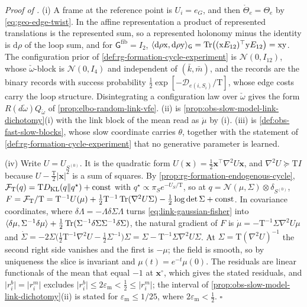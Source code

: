\noindent\emph{Proof of .}
(i) A frame at the reference point is $U_i=e_G$, and then $\mathring\Theta_e=\Theta_e$ by
\eqref{eq:geo-edge-twist}. In the affine representation a product of represented translations is the
represented sum, so a represented holonomy minus the identity is $\mathrm d\rho$ of the loop sum, and
for $\mathsf G^{\mathrm{fib}}=I_2$,
$\langle\mathrm d\rho\mathrm x,\mathrm d\rho\mathrm y\rangle_{\mathsf G}=\operatorname{Tr}\bigl((\mathrm xE_{12})^\top\mathrm yE_{12}\bigr)=\mathrm x\mathrm y$.
The configuration prior of \cref{def:rg-formation-cycle-experiment} is $\mathcal N(0,I_{12})$, whose
$\check\omega$-block is $\mathcal N(0,I_4)$ and independent of $(\bar k,\bar m)$, and the records are
the binary records with success probability $\tfrac12\exp[-\mathcal D_{e(i,S_i)}/\mathrm T]$, whose
edge costs carry the loop structure. Disintegrating a configuration law over $\check\omega$ gives the
form $R(d\check\omega)Q_{\check\omega}$ of \cref{prop:elbo-random-link-vfe}. (ii) is
\cref{prop:obs-slow-model-link-dichotomy}(i) with the link block of the mean read as
$\mathring\mu$ by (i). (iii) is \cref{def:obs-fast-slow-blocks}, whose slow coordinate carries
$\theta$, together with the statement of \cref{def:rg-formation-cycle-experiment} that no generative
parameter is learned.

(iv) Write $U=U_{S^{(0)}}$. It is the quadratic form
$U(\mathbf x)=\tfrac12\mathbf x^\top\nabla^2U\mathbf x$, and $\nabla^2U\succeq\mathrm TI$ because
$U-\tfrac{\mathrm T}2\lvert\mathbf x\rvert^2$ is a sum of squares. By
\cref{prop:rg-formation-endogenous-cycle}, $\mathcal F_{\mathrm T}(q)=\mathrm TD_{\mathrm{KL}}(q\Vert q^\star)+\mathrm{const}$
with $q^\star\propto\pi_Se^{-U_S/\mathrm T}$, so at $q=\mathcal N(\mu,\Sigma)\otimes\delta_{S^{(0)}}$,
$F=\mathcal F_{\mathrm T}/\mathrm T=\mathrm T^{-1}U(\mu)+\tfrac12\mathrm T^{-1}\operatorname{Tr}(\nabla^2U\Sigma)-\tfrac12\log\det\Sigma+\mathrm{const}$.
In covariance coordinates, where $\delta\Lambda=-\Lambda\delta\Sigma\Lambda$ turns
\eqref{eq:link-gaussian-fisher} into
$\langle\delta\mu,\Sigma^{-1}\delta\mu\rangle+\tfrac12\operatorname{Tr}(\Sigma^{-1}\delta\Sigma\Sigma^{-1}\delta\Sigma)$,
the natural gradient of $F$ is $\dot\mu=-\mathrm T^{-1}\Sigma\nabla^2U\mu$ and
$\dot\Sigma=-2\Sigma\bigl(\tfrac12\mathrm T^{-1}\nabla^2U-\tfrac12\Sigma^{-1}\bigr)\Sigma=\Sigma-\mathrm T^{-1}\Sigma\nabla^2U\Sigma$.
At $\Sigma=\mathrm T(\nabla^2U)^{-1}$ the second right side vanishes and the first is $-\mu$; the field
is smooth, so by uniqueness the slice is invariant and $\mu(t)=e^{-t}\mu(0)$. The residuals are linear
functionals of the mean that equal $-1$ at $\mathbf x^\circ$, which gives the stated residuals, and
$\lvert r^b_i\rvert=\lvert r^m_i\rvert$ excludes
$\lvert r^b_i\rvert\leq2\varepsilon_{\mathrm m}<\tfrac12\leq\lvert r^m_i\rvert$; the interval of
\cref{prop:obs-slow-model-link-dichotomy}(ii) is stated for $\varepsilon_{\mathrm m}\leq1/25$, where
$2\varepsilon_{\mathrm m}<\tfrac12$. \hfill$\square$

